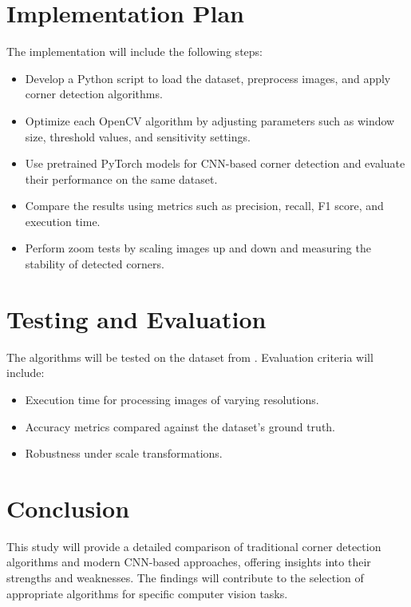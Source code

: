 \documentclass[journal]{IEEEtran}
\begin{document}
\section{Implementation Plan}
The implementation will include the following steps:
\begin{itemize}
    \item Develop a Python script to load the dataset, preprocess images, and apply corner detection algorithms.
    \item Optimize each OpenCV algorithm by adjusting parameters such as window size, threshold values, and sensitivity settings.
    \item Use pretrained PyTorch models for CNN-based corner detection and evaluate their performance on the same dataset.
    \item Compare the results using metrics such as precision, recall, F1 score, and execution time.
    \item Perform zoom tests by scaling images up and down and measuring the stability of detected corners.
\end{itemize}

\section{Testing and Evaluation}
The algorithms will be tested on the dataset from \cite{mdpi_dataset}. Evaluation criteria will include:
\begin{itemize}
    \item Execution time for processing images of varying resolutions.
    \item Accuracy metrics compared against the dataset’s ground truth.
    \item Robustness under scale transformations.
\end{itemize}

\section{Conclusion}
This study will provide a detailed comparison of traditional corner detection algorithms and modern CNN-based approaches, offering insights into their strengths and weaknesses. The findings will contribute to the selection of appropriate algorithms for specific computer vision tasks.



\end{document}
